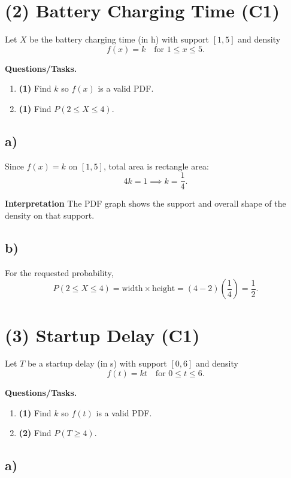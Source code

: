 \section{(2) Battery Charging Time (C1)}

Let $X$ be the battery charging time (in h) with support $[1,5]$ and density
\[
f(x)=k\quad\text{for }1\le x\le 5.
\]

\textbf{Questions/Tasks.}
\begin{enumerate}[label=\textbf{\alph*)}]
	\item \textbf{(1)} Find $k$ so $f(x)$ is a valid PDF.
	\item \textbf{(1)} Find $P(2\le X\le 4)$.
\end{enumerate}

\subsection*{a)}

Since $f(x)=k$ on $[1,5]$, total area is rectangle area:
\[
4k=1\implies k=\frac14.
\]

\textbf{Interpretation}
The PDF graph shows the support and overall shape of the density on that support.

\subsection*{b)}
For the requested probability,
\[
P(2\le X\le4)=\text{width}\times\text{height}=(4-2)\left(\frac14\right)=\frac12.
\]

\section{(3) Startup Delay (C1)}

Let $T$ be a startup delay (in s) with support $[0,6]$ and density
\[
f(t)=kt\quad\text{for }0\le t\le 6.
\]

\textbf{Questions/Tasks.}
\begin{enumerate}[label=\textbf{\alph*)}]
	\item \textbf{(1)} Find $k$ so $f(t)$ is a valid PDF.
	\item \textbf{(2)} Find $P(T\ge 4)$.
\end{enumerate}

\subsection*{a)}

